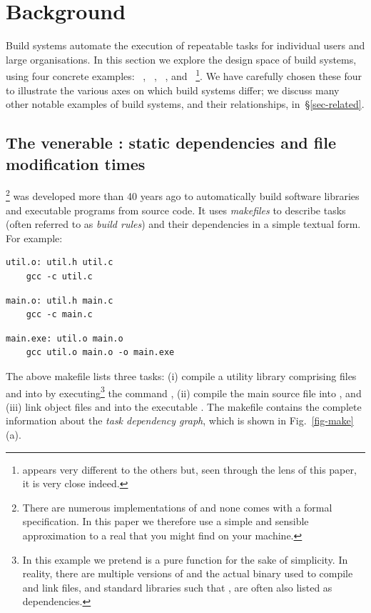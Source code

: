 \section{Background}\label{sec-background}

Build systems automate the execution of repeatable tasks for individual users
and large organisations. In this section we explore the design space of build
systems, using four concrete examples: \Make~\cite{feldman1979make},
\Shake~\cite{mitchell2012shake}, \Bazel~\cite{bazel}, and
\Excel~\cite{advanced_excel}\footnote{\Excel appears very different to the
others but, seen through the lens of this paper, it is very close indeed.}.
We have carefully chosen these four to illustrate the various axes on which
build systems differ; we discuss many other notable examples of build systems,
and their relationships, in~\S\ref{sec-related}.

\subsection{The venerable \Make: static dependencies and file modification times}
\label{sec-background-make}

\Make\footnote{There are numerous implementations of \Make and none comes with a
formal specification. In this paper we therefore use a simple and sensible
approximation to a real \Make that you might find on your machine.} was developed
more than 40 years ago to automatically build software libraries and executable
programs from source code. It uses \emph{makefiles} to describe tasks (often
referred to as \emph{build rules}) and their dependencies in a simple textual form.
For example:

\vspace{1mm}
\begin{verbatim}
util.o: util.h util.c
    gcc -c util.c
\end{verbatim}
\vspace{1mm}
\begin{verbatim}
main.o: util.h main.c
    gcc -c main.c
\end{verbatim}
\vspace{1mm}
\begin{verbatim}
main.exe: util.o main.o
    gcc util.o main.o -o main.exe
\end{verbatim}
\vspace{1mm}

\noindent
The above makefile lists three tasks: (i) compile a utility library comprising
files  and  into  by
executing\footnote{In this example we pretend  is a pure function for
the sake of simplicity. In reality, there are multiple versions of 
and the actual binary used to compile and link files, and standard libraries
such that , are often also listed as dependencies.} the command
, (ii) compile the main source file  into
, and (iii) link object files  and  into the
executable . The makefile contains the complete information about
the \emph{task dependency graph}, which is shown in Fig.~\ref{fig-make}(a).


